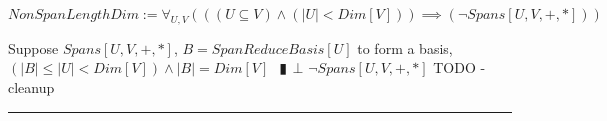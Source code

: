 \documentclass{book}
\newcommand{\abr}{:=}
\newcommand{\pipe}{$\phantom{(}\vrectangleblack\phantom{)}$}
\begin{document}
$NonSpanLengthDim \abr \forall_{U, V}(((U \subseteq V) \land (|U| < Dim[V])) \implies (\lnot Spans[U, V, +, *]))$
\begin{enumerate}
  \lit Suppose $Spans[U, V, +, *]$, $B = SpanReduceBasis[U]$ to form a basis, $(|B| \leq |U| < Dim[V]) \land |B| = Dim[V]$ \pipe $\bot$
  \lit $\lnot Spans[U, V, +, *]$
  \lit TODO - cleanup
\end{enumerate} \vspace{.75mm} \hrule \vspace{.75mm} \ \\ 

\begin{comment}
  $DimSub \abr \forall_{U, V}(((FinDim[V, +, *]) \land (Subspace[U, V, +, *])) \implies (Dim[U] \leq Dim[V]))$
  \begin{enumerate}
    \lit TODO ???
  \end{enumerate} \vspace{.75mm} \hrule \vspace{.75mm} \ \\ 

  $DimSum \abr \forall_{U_1, U_2, V}(((FinDim[V, +, *]) \land (Subspace[U_1, V, +, *]) \land (Subspace[U_2, V, +, *])) \\
      \implies (Dim[U_1 + U_2] = Dim[U_1] + Dim[U_2] - Dim[U_1 \cap U_2]))$
  \begin{enumerate}
    \lit TODO
  \end{enumerate} \vspace{.75mm} \hrule \vspace{.75mm} \ \\ 


\end{comment}
\end{document}
